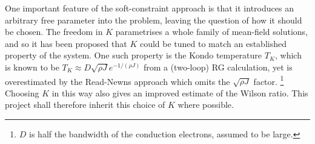 One important feature of the soft-constraint approach is that it introduces an arbitrary free parameter into the problem, leaving the question of how it should be chosen. The freedom in $ K $ parametrises a whole family of mean-field solutions, and so it has been proposed that $ K $ could be tuned to match an established property of the system. One such property is the Kondo temperature $ T_K $, which is known to be $ T_K \approx D \sqrt{\rho J} e^{- 1 / (\rho J)} $ from a (two-loop) RG calculation, yet is overestimated by the Read-Newns approach which omits the $ \sqrt{\rho J} $ factor. \footnote{$ D $ is half the bandwidth of the conduction electrons, assumed to be large.} Choosing $ K $ in this way also gives an improved estimate of the Wilson ratio. This project shall therefore inherit this choice of $ K $ where possible.


